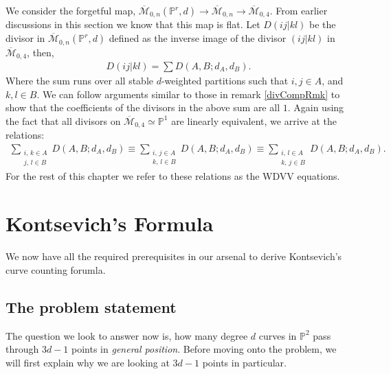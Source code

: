 \begin{remark}
    We consider the forgetful map, $\overline{\mathcal{M}}_{0,n}(\mathbb{P}^{r},d)\to \overline{\mathcal{M}}_{0,n} \to \overline{\mathcal{M}}_{0,4}$.
    From earlier discussions in this section we know that this map is flat.
    Let $D(ij|kl)$ be the divisor in $\overline{\mathcal{M}}_{0,n}(\mathbb{P}^{r},d)$ defined as the inverse image of the divisor $(ij|kl)$ in $\overline{\mathcal{M}}_{0,4}$, then,
    \begin{align*}
        D(ij|kl) = \sum D(A,B;d_{A},d_{B}).
    \end{align*}
    Where the sum runs over all stable $d$-weighted partitions such that $i,j \in A$, and $k,l \in B$.
    We can follow arguments similar to those in remark \ref{divCompRmk} to show that the coefficients of the divisors in the above sum are all $1$.
    Again using the fact that all divisors on $\overline{\mathcal{M}}_{0,4}\simeq \mathbb{P}^{1}$ are linearly equivalent, we arrive at the relations:
    \begin{align*}
        \sum_{\substack{i,\,k \in A \\j,\,l \in B}} D(A,B;d_{A},d_{B}) \equiv \sum_{\substack{i,\,j \in A \\k,\,l \in B}} D(A,B;d_{A},d_{B}) \equiv \sum_{\substack{i,\,l \in A \\k,\,j \in B}} D(A,B;d_{A},d_{B}).
    \end{align*}
    For the rest of this chapter we refer to these relations as the WDVV equations.
\end{remark}

\section{Kontsevich's Formula}

We now have all the required prerequisites in our arsenal to derive Kontsevich's curve counting forumla.

\subsection{The problem statement}
The question we look to answer now is, how many degree $d$ curves in $\mathbb{P}^{2}$ pass through $3d-1$ points in \textit{general position}. 
Before moving onto the problem, we will first explain why we are looking at $3d-1$ points in particular.

